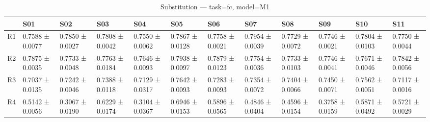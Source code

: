 \begin{table}[htbp]
\centering
\caption{Substitution — task=fc, model=M1}
\label{tab:sub:fc:M1}
\begin{tabular}{llllllllllll}
\toprule
\toprule
 & S01 & S02 & S03 & S04 & S05 & S06 & S07 & S08 & S09 & S10 & S11 \\
\midrule
\midrule
R1 & 0.7588 ± 0.0077 & 0.7850 ± 0.0027 & 0.7808 ± 0.0042 & 0.7550 ± 0.0062 & 0.7867 ± 0.0128 & 0.7758 ± 0.0021 & 0.7954 ± 0.0039 & 0.7729 ± 0.0072 & 0.7746 ± 0.0021 & 0.7804 ± 0.0103 & 0.7750 ± 0.0044 \\
R2 & 0.7875 ± 0.0035 & 0.7733 ± 0.0048 & 0.7763 ± 0.0184 & 0.7646 ± 0.0093 & 0.7938 ± 0.0097 & 0.7879 ± 0.0123 & 0.7754 ± 0.0036 & 0.7733 ± 0.0103 & 0.7746 ± 0.0041 & 0.7671 ± 0.0046 & 0.7842 ± 0.0056 \\
R3 & 0.7037 ± 0.0135 & 0.7242 ± 0.0046 & 0.7388 ± 0.0118 & 0.7129 ± 0.0317 & 0.7642 ± 0.0093 & 0.7283 ± 0.0093 & 0.7354 ± 0.0072 & 0.7404 ± 0.0066 & 0.7450 ± 0.0071 & 0.7562 ± 0.0051 & 0.7117 ± 0.0016 \\
R4 & 0.5142 ± 0.0056 & 0.3067 ± 0.0190 & 0.6229 ± 0.0174 & 0.3104 ± 0.0367 & 0.6946 ± 0.0153 & 0.5896 ± 0.0565 & 0.4846 ± 0.0404 & 0.4596 ± 0.0154 & 0.3758 ± 0.0159 & 0.5871 ± 0.0492 & 0.5721 ± 0.0029 \\
\bottomrule
\end{tabular}\end{table}
